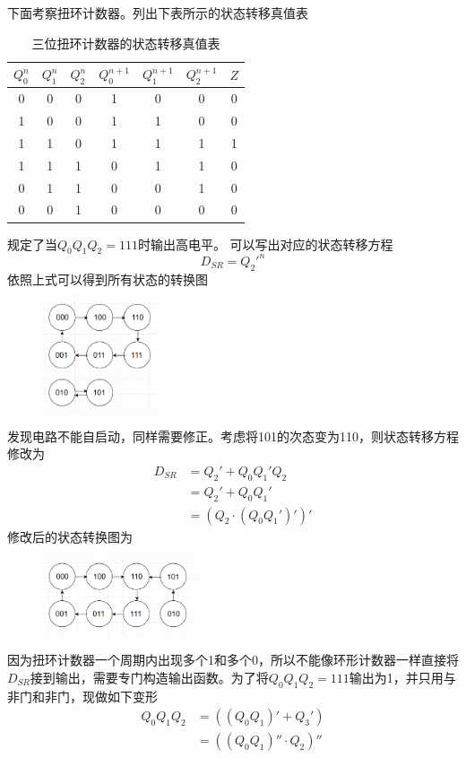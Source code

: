 \documentclass{ctexart}
\begin{document}
下面考察扭环计数器。列出下表所示的状态转移真值表
\begin{table}[H]
    \centering
    \caption{三位扭环计数器的状态转移真值表}
    \begin{tabular}{ccccccc}
    \hline 
        $Q_0^n$ & $Q_1^n$ & $Q_2^n$ & $Q_0^{n+1}$ & $Q_1^{n+1}$ & $Q_2^{n+1}$ & $Z$\\ \hline 
        0 & 0 & 0 & 1 & 0 & 0 & 0\\
        1 & 0 & 0 & 1 & 1 & 0 & 0\\
        1 & 1 & 0 & 1 & 1 & 1 & 1\\
        1 & 1 & 1 & 0 & 1 & 1 & 0\\ 
        0 & 1 & 1 & 0 & 0 & 1 & 0\\ 
        0 & 0 & 1 & 0 & 0 & 0 & 0\\ \hline
    \end{tabular}
    \label{状态转移真值表}
\end{table}
规定了当$Q_0Q_1Q_2=111$时输出高电平。
可以写出对应的状态转移方程
\begin{equation}\label{1}
    D_{SR}=Q_2'^{n}
\end{equation}
依照上式可以得到所有状态的转换图
\begin{figure}[H]
    \centering
    \includegraphics[width=0.3\textwidth]{不能自启动.png}
\end{figure}
发现电路不能自启动，同样需要修正。考虑将101的次态变为110，则状态转移方程修改为
\begin{align}
    D_{SR}&=Q_2'+Q_0Q_1'Q_2\\
    &=Q_2'+Q_0Q_1'\\
    &=(Q_2\cdot (Q_0Q_1')')'
\end{align}
修改后的状态转换图为
\begin{figure}[H]
    \centering
    \includegraphics[width=0.4\textwidth]{自启动.png}
\end{figure}
因为扭环计数器一个周期内出现多个1和多个0，所以不能像环形计数器一样直接将$D_{SR}$接到输出，需要专门构造输出函数。为了将$Q_0Q_1Q_2=111$输出为1，并只用与非门和非门，现做如下变形
\begin{align}
    Q_0Q_1Q_2&=((Q_0Q_1)'+Q_3')\\
    &=((Q_0Q_1)''\cdot Q_2)''
\end{align}
\end{document}

